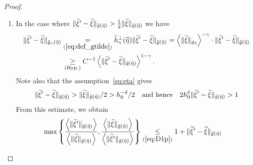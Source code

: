 \documentclass[AHL,Unicode,longabstracts,published]{cedram}
\newcommand*\eq[1]{\underset{(#1)}{=}}
\newcommand*\ineq[1]{\underset{(#1)}{\leq}}
\let\oldtilde\tilde
\renewcommand*{\tilde}[1]{\mathchoice{\widetilde{#1}}{\widetilde{#1}}{\oldtilde{#1}}{\oldtilde{#1}}}
\begin{document}
\begin{proof}
\begin{enumerate}
\begin{align}\label{eq:log3}
\max\left\{ \frac{\left\langle\|\tilde{\xi}'\|_{\tilde{g}\left(\tilde{\eta}\right)}\right\rangle}{\left\langle\|\tilde{\xi}\|_{\tilde{g}\left(\tilde{\eta}\right)}\right\rangle},\frac{\left\langle\|\tilde{\xi}\|_{\tilde{g}\left(\tilde{\eta}\right)}\right\rangle}{\left\langle\|\tilde{\xi}'\|_{\tilde{g}\left(\tilde{\eta}\right)}\right\rangle}\right\} & \ineq{\ref{eq:*10}}1+2\left\langle\|\tilde{\xi}\|_{\tilde{g}\left(\tilde{\eta}\right)}\right\rangle^{-(1-\gamma)}\|\tilde{\xi}'-\tilde{\xi}\|_{\tilde{g}_{\gamma}\left(\tilde{\eta}\right)}
\\
& \mkern9mu\le1+Ch_{0}^{\mu}\left\langle\|\tilde{\xi}'-\tilde{\xi}\|_{\tilde{g}_{\gamma}\left(\tilde{\eta}\right)}\right\rangle.
\end{align}
where $\mu=\delta(1-\gamma)<1$ because $\langle\|\tilde{\xi}\|_{\tilde{g}(\tilde{\eta})}\rangle^{-(1-\gamma)}\ineq{\ref{eq:eta}}h_{0}^{\delta(1-\gamma)}$.
\item In the case where $\|\tilde{\xi}'-\tilde{\xi}\|_{\tilde{g}(\tilde{\eta})}>\frac{1}{2}\|\tilde{\xi}\|_{\tilde{g}(\tilde{\eta})}$ we have
\begin{align}\label{eq:*5}
\begin{split}
\|\tilde{\xi}'-\tilde{\xi}\|_{\tilde{g}_{\gamma}\left(\tilde{\eta}\right)} & \eq{\ref{eq:def_gtilde}}\tilde{h}_{\gamma}^{\perp}(\tilde{\eta})\|\tilde{\xi}'-\tilde{\xi}\|_{\tilde{g}\left(\tilde{\eta}\right)}=\left\langle\|\tilde{\xi}\|_{g_{\tilde{\eta}}}\right\rangle^{-\gamma}\cdot\|\tilde{\xi}'-\tilde{\xi}\|_{\tilde{g}\left(\tilde{\eta}\right)}\\
& \mkern3mu\underset{(\mathrm{Hyp.})}{\geq}C^{-1}\left\langle\|\tilde{\xi}'-\tilde{\xi}\|_{\tilde{g}\left(\tilde{\eta}\right)}\right\rangle^{1-\gamma}.
\end{split}
\end{align}
Note also that the assumption~\eqref{eq:eta} gives
\begin{equation}
\|\tilde{\xi}'-\tilde{\xi}\|_{\tilde{g}\left(\tilde{\eta}\right)}>\|\tilde{\xi}\|_{\tilde{g}\left(\tilde{\eta}\right)}/2>h_{0}^{-\delta}/2\quad\text{and hence}\quad2h_{0}^{\delta}\|\tilde{\xi}'-\tilde{\xi}\|_{\tilde{g}\left(\tilde{\eta}\right)}>1\label{eq:a}
\end{equation}
From this estimate, we obtain
\begin{equation}\label{log2}
\begin{split}
\max\left\{ \frac{\left\langle\|\tilde{\xi}'\|_{\tilde{g}\left(\tilde{\eta}\right)}\right\rangle}{\left\langle\|\tilde{\xi}\|_{\tilde{g}\left(\tilde{\eta}\right)}\right\rangle},\frac{\left\langle\|\tilde{\xi}\|_{\tilde{g}\left(\tilde{\eta}\right)}\right\rangle}{\left\langle\|\tilde{\xi}'\|_{\tilde{g}\left(\tilde{\eta}\right)}\right\rangle}\right\} & \ineq{\ref{eq:D1p}}1+\|\tilde{\xi}'-\tilde{\xi}\|_{\tilde{g}\left(\tilde{\eta}\right)}

\end{split}
\end{equation}
\end{enumerate}
\end{proof}
\end{document}

